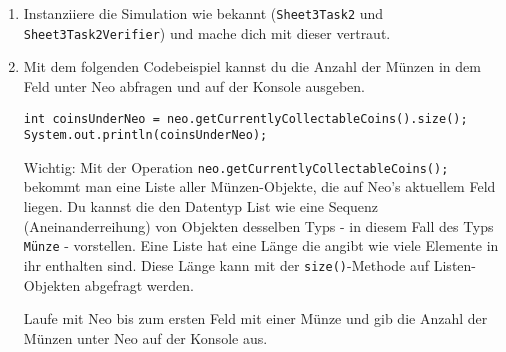 
\begin{enumerate}
	\item
	Instanziiere die Simulation wie bekannt (\lstinline{Sheet3Task2} und \lstinline{Sheet3Task2Verifier}) und mache dich mit dieser vertraut.

	\item
		Mit dem folgenden Codebeispiel kannst du die Anzahl der Münzen in dem Feld unter Neo abfragen und auf der Konsole ausgeben.

		\begin{lstlisting}
int coinsUnderNeo = neo.getCurrentlyCollectableCoins().size();
System.out.println(coinsUnderNeo);
		\end{lstlisting}

		Wichtig: Mit der Operation \lstinline{neo.getCurrentlyCollectableCoins();} bekommt man eine Liste aller Münzen-Objekte, die auf Neo's aktuellem Feld liegen.
		Du kannst die den Datentyp List wie eine Sequenz (Aneinanderreihung) von Objekten desselben Typs - in diesem Fall des Typs \lstinline{Münze} - vorstellen.
		Eine Liste hat eine Länge die angibt wie viele Elemente in ihr enthalten sind.
		Diese Länge kann mit der \lstinline{size()}-Methode auf Listen-Objekten abgefragt werden.

		Laufe mit Neo bis zum ersten Feld mit einer Münze und gib die Anzahl der Münzen unter Neo auf der Konsole aus.
\end{enumerate}



